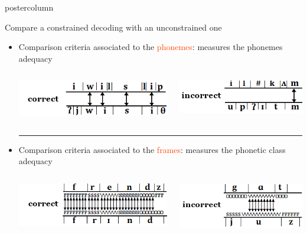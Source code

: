 \documentclass[final,hyperref={pdfpagelabels=false}]{beamer}
\begin{document}
\begin{frame}
\begin{columns}
\begin{column}{.40\textwidth}
\begin{beamercolorbox}[center,wd=\textwidth]{postercolumn}
\begin{minipage}[T]{.95\textwidth}
{\begin{block}{Compare a constrained decoding with an unconstrained one}
	\begin{itemize}
		\item Comparison criteria associated to the \textcolor{OrangeRed}{phonemes}: measures the phonemes adequacy
			\begin{columns}
				\begin{column}{0.50\textwidth} \hfill\includegraphics[scale=1.1]{Image/criteria/ph_correct.png}\end{column}
				\begin{column}{0.50\textwidth} \begin{center}\includegraphics[scale=1]{Image/criteria/ph_incorrect.png}\end{center}\end{column}
			\end{columns}
			\textcolor{ta3skyblue}{\rule[0.1ex]{0.97\textwidth}{1.6pt}}
%
		\item Comparison criteria associated to the \textcolor{OrangeRed}{frames}: measures the phonetic class adequacy
			\begin{columns}
				\begin{column}{0.50\textwidth} \hfill\includegraphics[scale=1]{Image/criteria/tr_correct.png}\end{column}
				\begin{column}{0.50\textwidth} \begin{center}\includegraphics[scale=1]{Image/criteria/tr_incorrect.png}\end{center}\end{column}

\end{columns}
\end{itemize}
\end{block}}
\end{minipage}
\end{beamercolorbox}
\end{column}
\end{columns}
\end{frame}
\end{document}
